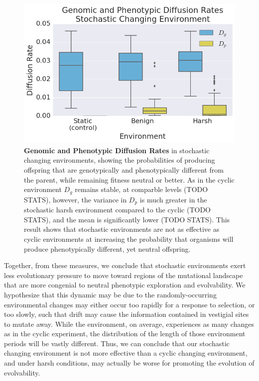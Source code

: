 \documentclass[letterpaper]{article}
\begin{document}
\begin{figure}[h!] %
\begin{center}
\includegraphics[trim={0.2cm 0 0.4cm 0.25cm},clip,width=1\columnwidth]{figures/CSE_D_g_D_p__box.png}
\caption{\textbf{Genomic and Phenotypic Diffusion Rates} in stochastic changing environments, showing the probabilities of producing offspring that are genotypically and phenotypically different from the parent, while remaining fitness neutral or better. As in the cyclic environment $D_g$ remains stable, at comparble levels (TODO STATS), however, the variance in $D_p$ is much greater in the stochastic harsh environment compared to the cyclic (TODO STATS), and the mean is significantly lower (TODO STATS). This result shows that stochastic environments are not as effective as cyclic environments at increasing the probability that organisms will produce phenotypically different, yet neutral offspring.
}\label{fig:CSE_diffusion_rate}
\end{center}
\end{figure}
%
Together, from these measures, we conclude that stochastic environments exert less evolutionary pressure to move toward regions of the mutational landscape that are more congenial to neutral phenotypic exploration and evolvability. We hypothesize that this dynamic may be due to the randomly-occurring environmental changes may either occur too rapidly for a response to selection, or too slowly, such that drift may cause the information contained in vestigial sites to mutate away. While the environment, on average, experiences as many changes as in the cyclic experiment, the distribution of the length of those environment periods will be vastly different. Thus, we can conclude that our stochastic changing environment is not more effective than a cyclic changing environment, and under harsh conditions, may actually be worse for promoting the evolution of evolvability.
\end{document}
